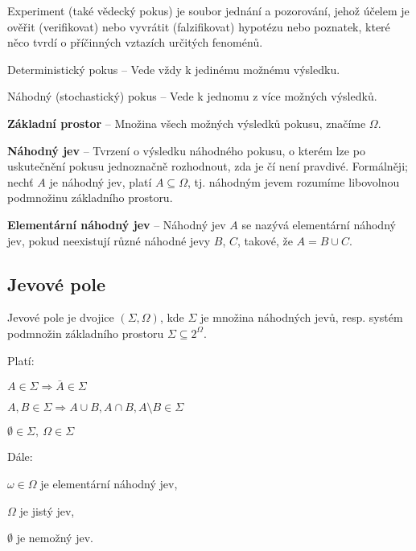 \begin{compactitem}
    \item Experiment (také vědecký pokus) je soubor jednání a pozorování, jehož účelem je ověřit (verifikovat) nebo vyvrátit (falzifikovat) hypotézu nebo poznatek, které něco tvrdí o příčinných vztazích určitých fenoménů. \begin{compactitem}

        \item Deterministický pokus -- Vede vždy k jedinému možnému výsledku.

        \item Náhodný (stochastický) pokus -- Vede k jednomu z více možných výsledků.
    \end{compactitem}

    \item \textbf{Základní prostor} -- Množina všech možných výsledků pokusu, značíme $\Omega$.

    \item \textbf{Náhodný jev} -- Tvrzení o výsledku náhodného pokusu, o kterém lze po uskutečnění pokusu jednoznačně rozhodnout, zda je čí není pravdivé. Formálněji; nechť $A$ je náhodný jev, platí $A \subseteq \Omega$, tj. náhodným jevem rozumíme libovolnou podmnožinu základního prostoru.

    \item \textbf{Elementární náhodný jev} -- Náhodný jev $A$ se nazývá elementární náhodný jev, pokud neexistují různé náhodné jevy $B$, $C$, takové, že $A = B \cup C$.
\end{compactitem}

\subsection{Jevové pole}

\begin{compactitem}
    \item Jevové pole je dvojice $(\Sigma, \Omega)$, kde $\Sigma$ je množina náhodných jevů, resp. systém podmnožin základního prostoru $\Sigma \subseteq 2^{\Omega}$.

    \item Platí: \begin{compactenum}
        \item $ A \in \Sigma \Rightarrow \bar{A} \in \Sigma $
        \item $ A, B \in \Sigma \Rightarrow A \cup B, A \cap B, A \setminus B \in \Sigma $
        \item $ \emptyset \in \Sigma,~ \Omega \in \Sigma $
    \end{compactenum}

    \item Dále: \begin{compactitem}
        \item $\omega \in \Omega$ je elementární náhodný jev,
        \item $\Omega$ je jistý jev,
        \item $\emptyset$ je nemožný jev.
    \end{compactitem}

\end{compactitem}

